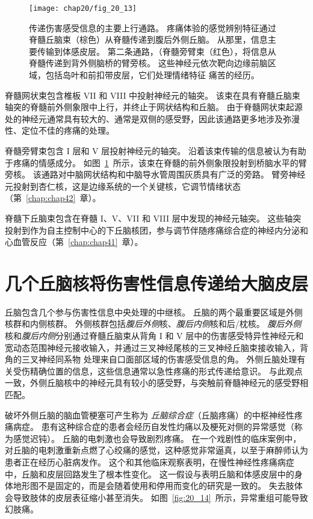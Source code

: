 \begin{figure}[htbp]
	\centering
	\texttt{[image: chap20/fig\_20\_13]}
	\caption{传递伤害感受信息的主要上行通路。
		疼痛体验的感觉辨别特征通过脊髓丘脑束（棕色）从脊髓传递到腹后外侧丘脑。
		从那里，信息主要传输到体感皮层。
		第二条通路，（脊髓旁臂束（红色），将信息从脊髓传递到背外侧脑桥的臂旁核。
		这些神经元依次靶向边缘前脑区域，包括岛叶和前扣带皮层，它们处理情绪特征 痛苦的经历。}
	\label{fig:20_13}
\end{figure}


脊髓网状束包含椎板 VII 和 VIII 中投射神经元的轴突。
该束在具有脊髓丘脑束轴突的脊髓前外侧象限中上行，并终止于网状结构和丘脑。
由于脊髓网状束起源处的神经元通常具有较大的、通常是双侧的感受野，因此该通路更多地涉及弥漫性、定位不佳的疼痛的处理。


脊髓旁臂束包含 I 层和 V 层投射神经元的轴突。
沿着该束传输的信息被认为有助于疼痛的情感成分。
如图~\ref{fig:20_13}~所示，该束在脊髓的前外侧象限投射到桥脑水平的臂旁核。
该通路对中脑网状结构和中脑导水管周围灰质具有广泛的旁路。
臂旁神经元投射到杏仁核，这是边缘系统的一个关键核，它调节情绪状态（第~\ref{chap:chap42}~章）。


脊髓下丘脑束包含在脊髓 I、V、VII 和 VIII 层中发现的神经元轴突。
这些轴突投射到作为自主控制中心的下丘脑核团，参与调节伴随疼痛综合症的神经内分泌和心血管反应（第~\ref{chap:chap41}~章）。



\section{几个丘脑核将伤害性信息传递给大脑皮层}

丘脑包含几个参与伤害性信息中央处理的中继核。
丘脑的两个最重要区域是外侧核群和内侧核群。
外侧核群包括\textit{腹后外侧}核、\textit{腹后内侧}核和后/枕核。
\textit{腹后外侧}核和\textit{腹后内侧}分别通过脊髓丘脑束从背角 I 和 V 层中的伤害感受特异性神经元和宽动态范围神经元接收输入，并通过三叉神经尾核的三叉神经丘脑束接收输入，背角的三叉神经同系物 处理来自口面部区域的伤害感受信息的角。
外侧丘脑处理有关受伤精确位置的信息，这些信息通常以急性疼痛的形式传递给意识。
与此观点一致，外侧丘脑核中的神经元具有较小的感受野，与突触前脊髓神经元的感受野相匹配。


破坏外侧丘脑的脑血管梗塞可产生称为 \textit{丘脑综合症}（丘脑疼痛）的中枢神经性疼痛病症。
患有这种综合症的患者会经历自发性灼痛以及梗死对侧的异常感觉（称为感觉迟钝）。
丘脑的电刺激也会导致剧烈疼痛。
在一个戏剧性的临床案例中，对丘脑的电刺激重新点燃了心绞痛的感觉，这种感觉非常逼真，以至于麻醉师认为患者正在经历心脏病发作。
这个和其他临床观察表明，在慢性神经性疼痛病症中，丘脑和皮层回路发生了根本性变化。
这一假设与表明丘脑和体感皮层中的身体地形图不是固定的，而是会随着使用和停用而变化的研究是一致的。
失去肢体会导致肢体的皮层表征缩小甚至消失。
如图~\ref{fig:20_14}~所示，异常重组可能导致幻肢痛。


